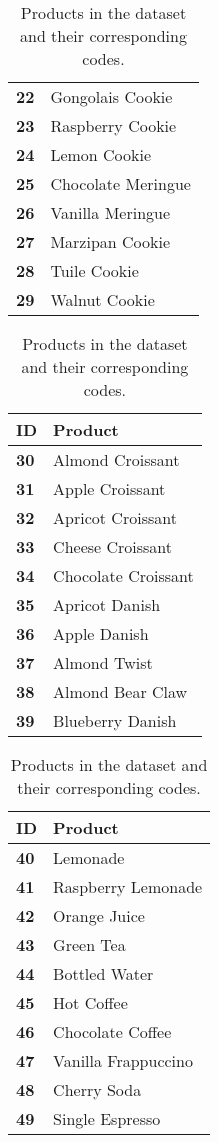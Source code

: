 \documentclass[paper=a4, fontsize=11pt]{scrartcl} %
\numberwithin{equation}{section} %
\numberwithin{figure}{section} %
\numberwithin{table}{section} %
\begin{document}
\begin{table}[h]
\begin{minipage}[t]{0.19\linewidth}
\begin{tabular}[t]{ll}
\textbf{22} & Gongolais Cookie \\
\textbf{23} & Raspberry Cookie \\
\textbf{24} & Lemon Cookie \\
\textbf{25} & Chocolate Meringue \\
\textbf{26} & Vanilla Meringue \\
\textbf{27} & Marzipan Cookie \\
\textbf{28} & Tuile Cookie \\
\textbf{29} & Walnut Cookie \\
    \bottomrule
    \end{tabular}%
\end{minipage}
\begin{minipage}[t]{0.19\linewidth}
\centering
    \begin{tabular}[t]{ll}
    \toprule
\textbf{ID} & \textbf{Product} \\
    \midrule
\textbf{30} & Almond Croissant \\
\textbf{31} & Apple Croissant \\
\textbf{32} & Apricot Croissant \\
\textbf{33} & Cheese Croissant \\
\textbf{34} & Chocolate Croissant \\
\textbf{35} & Apricot Danish \\
\textbf{36} & Apple Danish \\
\textbf{37} & Almond Twist \\
\textbf{38} & Almond Bear Claw \\
\textbf{39} & Blueberry Danish \\
    \bottomrule
    \end{tabular}%
\end{minipage}
\begin{minipage}[t]{0.19\linewidth}
\centering
    \begin{tabular}[t]{ll}
    \toprule
\textbf{ID} & \textbf{Product} \\
    \midrule
\textbf{40} & Lemonade \\
\textbf{41} & Raspberry Lemonade \\
\textbf{42} & Orange Juice \\
\textbf{43} & Green Tea \\
\textbf{44} & Bottled Water \\
\textbf{45} & Hot Coffee \\
\textbf{46} & Chocolate Coffee \\
\textbf{47} & Vanilla Frappuccino \\
\textbf{48} & Cherry Soda \\
\textbf{49} & Single Espresso \\
    \bottomrule
    \end{tabular}%
\end{minipage}
\endgroup
\caption{Products in the dataset and their corresponding codes.}
\end{table}
\end{document}
